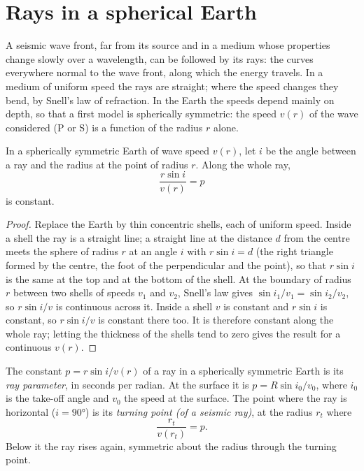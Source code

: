 \section{Rays in a spherical Earth}

A seismic wave front, far from its source and in a medium whose properties
change slowly over a wavelength, can be followed by its rays: the curves
everywhere normal to the wave front, along which the energy travels. In a
medium of uniform speed the rays are straight; where the speed changes they
bend, by Snell's law of refraction. In the Earth the speeds depend mainly on
depth, so that a first model is spherically symmetric: the speed $v(r)$ of the
wave considered (P or S) is a function of the radius $r$ alone.

\begin{theorem}\label{thm:b3:seismology-imaging:snell}
In a spherically symmetric Earth of wave speed $v(r)$, let $i$ be the angle
between a ray and the radius at the point of radius $r$. Along the whole ray,
\[
  \frac{r\sin i}{v(r)} = p
\]
is constant.
\end{theorem}

\begin{proof}
Replace the Earth by thin concentric shells, each of uniform speed. Inside a
shell the ray is a straight line; a straight line at the distance $d$ from the
centre meets the sphere of radius $r$ at an angle $i$ with
$r\sin i = d$ (the right triangle formed by the centre, the foot of the
perpendicular and the point), so that $r\sin i$ is the same at the top and at
the bottom of the shell. At the boundary of radius $r$ between two shells of
speeds $v_1$ and $v_2$, Snell's law gives $\sin i_1/v_1 = \sin i_2/v_2$, so
$r\sin i/v$ is continuous across it. Inside a shell $v$ is constant and
$r\sin i$ is constant, so $r\sin i/v$ is constant there too. It is therefore
constant along the whole ray; letting the thickness of the shells tend to
zero gives the result for a continuous $v(r)$.
\end{proof}

\begin{definition}\label{def:b3:seismology-imaging:ray-parameter}
The constant $p = r\sin i/v(r)$ of a ray in a spherically symmetric Earth is
its \emph{ray parameter}, in seconds per radian. At the
surface it is $p = R\sin i_0/v_0$, where $i_0$ is the take-off angle and $v_0$
the speed at the surface. The point where the ray is horizontal ($i = \ang{90}$)
is its \emph{turning point (of a seismic ray)},
at the radius $r_t$ where
\[
  \frac{r_t}{v(r_t)} = p .
\]
Below it the ray rises again, symmetric about the radius through the turning
point.
\end{definition}

